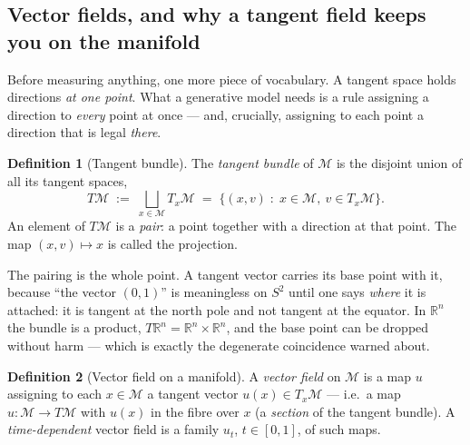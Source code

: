 \documentclass[11pt,a4paper]{report}
\theoremstyle{definition}
\newtheorem{definition}[definition]{Definition}
\theoremstyle{remark}
\newcommand{\RR}{\mathbb R}
\begin{document}
\subsection{Vector fields, and why a tangent field keeps you on the manifold}
\label{sec:manifold-vector-fields}

Before measuring anything, one more piece of vocabulary. A tangent space
holds directions \emph{at one point}. What a generative model needs is a
rule assigning a direction to \emph{every} point at once --- and, crucially,
assigning to each point a direction that is legal \emph{there}.

\begin{definition}[Tangent bundle]
\label{def:tangent-bundle}
The \emph{tangent bundle} of $\mathcal M$ is the disjoint union of all its
tangent spaces,
\[
T\mathcal M \;:=\; \bigsqcup_{x\in\mathcal M} T_x\mathcal M
\;=\;\bigl\{(x,v)\;:\;x\in\mathcal M,\ v\in T_x\mathcal M\bigr\} .
\]
An element of $T\mathcal M$ is a \emph{pair}: a point together with a
direction at that point. The map $(x,v)\mapsto x$ is called the projection.
\end{definition}

The pairing is the whole point. A tangent vector carries its base point with
it, because ``the vector $(0,1)$'' is meaningless on $S^2$ until one says
\emph{where} it is attached: it is tangent at the north pole and not tangent
at the equator. In $\RR^n$ the bundle is a product, $T\RR^n=\RR^n\times\RR^n$,
and the base point can be dropped without harm --- which is exactly the
degenerate coincidence  warned about.

\begin{definition}[Vector field on a manifold]
\label{def:vector-field-manifold}
A \emph{vector field} on $\mathcal M$ is a map $u$ assigning to each
$x\in\mathcal M$ a tangent vector $u(x)\in T_x\mathcal M$ --- i.e.\ a map
$u:\mathcal M\to T\mathcal M$ with $u(x)$ in the fibre over $x$ (a
\emph{section} of the tangent bundle). A \emph{time-dependent} vector field
is a family $u_t$, $t\in[0,1]$, of such maps.
\end{definition}
\end{document}
